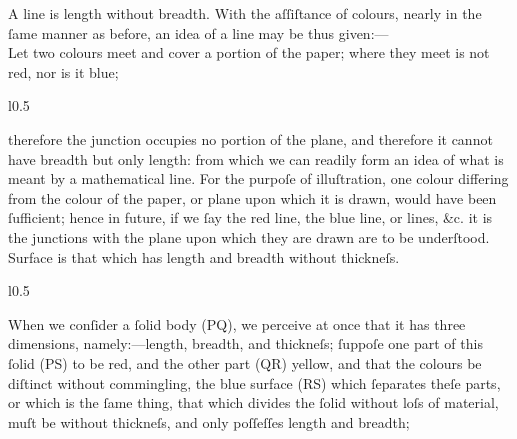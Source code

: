 \begin{minipage}{0.20\textwidth}
    \phantom{}
\end{minipage}%
\begin{minipage}{0.80\textwidth}
    A line is length without breadth. With the aſſiſtance of colours, nearly in the ſame manner as before, an idea of a line may be thus given:—\\

    Let two colours meet and cover a portion of the paper; where they meet is not red, nor is it blue;
    \begin{wrapfigure}{l}{0.5\textwidth}
        \centering
        
    \end{wrapfigure}
    therefore the junction occupies no portion of the plane, and therefore it cannot have breadth but only length: from which we can readily form an idea of what is meant by a mathematical line.  For the purpoſe of illuſtration, one colour differing from the colour of the paper, or plane upon which it is drawn, would have been ſufficient; hence in future, if we ſay the red line, the blue line, or lines, \&c. it is the junctions with the plane upon which they are drawn are to be underſtood.\\

    Surface is that which has length and breadth without thickneſs.
    \begin{wrapfigure}{l}{0.5\textwidth}
        \centering
        
    \end{wrapfigure}
    When we conſider a ſolid body (PQ), we perceive at once that it has three dimensions, namely:—length, breadth, and thickneſs;  ſuppoſe one part of this ſolid (PS) to be red, and the other part (QR) yellow, and that the colours be diſtinct without commingling, the blue surface (RS) which ſeparates theſe parts, or which is the ſame thing, that which divides the ſolid without loſs of material, muſt be without thickneſs, and only poſſeſſes length and breadth;
\end{minipage}%

\newpage


